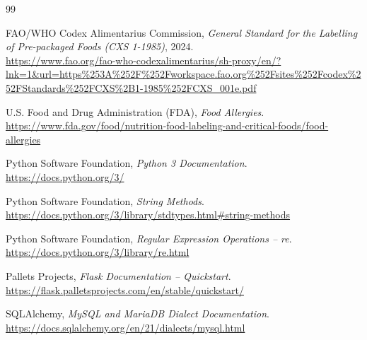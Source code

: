 \documentclass[12pt,a4paper,oneside]{book}
\begin{document}
	\backmatter
	
	\cleardoublepage
	
	\begin{thebibliography}{99}
		
		
		FAO/WHO Codex Alimentarius Commission,
		\textit{General Standard for the Labelling of Pre-packaged Foods
			(CXS 1-1985)}, 2024.
		\\
		\url{https://www.fao.org/fao-who-codexalimentarius/sh-proxy/en/?lnk=1&url=https\%253A\%252F\%252Fworkspace.fao.org\%252Fsites\%252Fcodex\%252FStandards\%252FCXS\%2B1-1985\%252FCXS_001e.pdf}
		
		U.S. Food and Drug Administration (FDA),
		\textit{Food Allergies}.
		\\
		\url{https://www.fda.gov/food/nutrition-food-labeling-and-critical-foods/food-allergies}
		
		
		Python Software Foundation,
		\textit{Python 3 Documentation}.
		\\
		\url{https://docs.python.org/3/}
		
		Python Software Foundation,
		\textit{String Methods}.
		\\
		\url{https://docs.python.org/3/library/stdtypes.html#string-methods}
		
		Python Software Foundation,
		\textit{Regular Expression Operations -- re}.
		\\
		\url{https://docs.python.org/3/library/re.html}
		
		
		Pallets Projects,
		\textit{Flask Documentation -- Quickstart}.
		\\
		\url{https://flask.palletsprojects.com/en/stable/quickstart/}
		
		SQLAlchemy,
		\textit{MySQL and MariaDB Dialect Documentation}.
		\\
		\url{https://docs.sqlalchemy.org/en/21/dialects/mysql.html}
		

\end{thebibliography}
\end{document}
